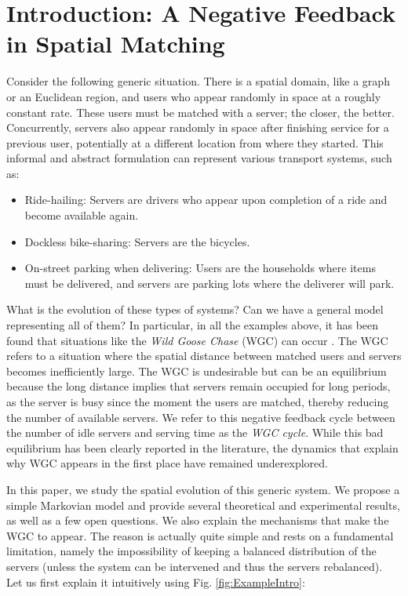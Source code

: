 \documentclass[12pt,english]{article}
\begin{document}
\section{Introduction: A Negative Feedback in Spatial Matching}\label{sec:INTRO}
Consider the following generic situation. There is a spatial domain, like a graph or an Euclidean region, and users who appear randomly in space at a roughly constant rate. These users must be matched with a server; the closer, the better.  Concurrently, servers also appear randomly in space after finishing service for a previous user, potentially at a different location from where they started. This informal and abstract formulation can represent various transport systems, such as: 

\begin{itemize}
    \item Ride-hailing: Servers are drivers who appear upon completion of a ride and become available again.
    \item Dockless bike-sharing: Servers are the bicycles.
    \item On-street parking when delivering: Users are the households where items must be delivered, and servers are parking lots where the deliverer will park.
\end{itemize}

What is the evolution of these types of systems? Can we have a general model representing all of them? In particular, in all the examples above, it has been found that situations like the \textit{Wild Goose Chase} (WGC) can occur \citep{xu2024economic,castillo2017surge,ouyang2023measurement,emami2024integrated,li2025wild,fielbaum2025coordination}. The WGC refers to a situation where the spatial distance between matched users and servers becomes inefficiently large. The WGC is undesirable but can be an equilibrium because the long distance implies that servers remain occupied for long periods, as the server is busy since the moment the users are matched, thereby reducing the number of available servers. We refer to this negative feedback cycle between the number of idle servers and serving time as the \textit{WGC cycle}. While this bad equilibrium has been clearly reported in the literature, the dynamics that explain why WGC appears in the first place have remained underexplored.

In this paper, we study the spatial evolution of this generic system. We propose a simple Markovian model and provide several theoretical and experimental results, as well as a few open questions. We also explain the mechanisms that make the WGC to appear. The reason is actually quite simple and rests on a fundamental limitation, namely the impossibility of keeping a balanced distribution of the servers (unless the system can be intervened and thus the servers rebalanced). Let us first explain it intuitively using Fig. \ref{fig:ExampleIntro}:
\end{document}
